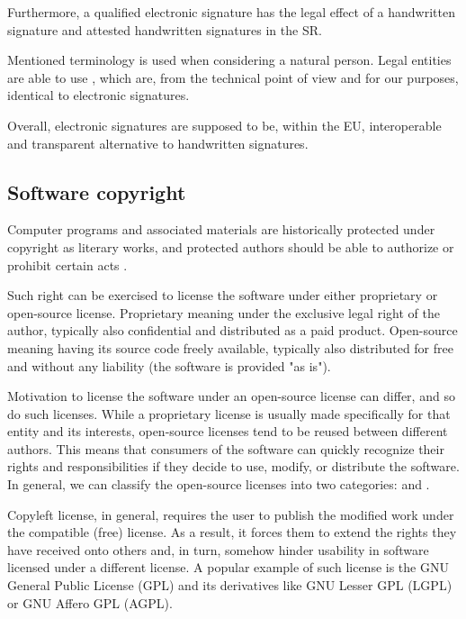 \documentclass[thesismargins, english, thesislinespacing, onelinechapterstyle, upjsfrontpage]{rnthesis}
\begin{document}
Furthermore, a qualified electronic signature has the legal effect of a handwritten signature \cite{eidas} and attested handwritten signatures in the SR.

Mentioned terminology is used when considering a natural person. Legal entities are able to use , which are, from the technical point of view and for our purposes, identical to electronic signatures.

Overall, electronic signatures are supposed to be, within the EU, interoperable and transparent alternative to handwritten signatures.

\subsection{Software copyright} \label{copyright}

Computer programs and associated materials are historically protected under copyright as literary works, and protected authors should be able to authorize or prohibit certain acts \cite{eeccopyright}.

Such right can be exercised to license the software under either proprietary or open-source license.
Proprietary meaning under the exclusive legal right of the author, typically also confidential and distributed as a paid product.
Open-source meaning having its source code freely available, typically also distributed for free and without any liability (the software is provided "as is").

Motivation to license the software under an open-source license can differ, and so do such licenses.
While a proprietary license is usually made specifically for that entity and its interests, open-source licenses tend to be reused between different authors.
This means that consumers of the software can quickly recognize their rights and responsibilities if they decide to use, modify, or distribute the software.
In general, we can classify the open-source licenses into two categories:  and .

Copyleft license, in general, requires the user to publish the modified work under the compatible (free) license.
As a result, it forces them to extend the rights they have received onto others and, in turn, somehow hinder usability in software licensed under a different license.
A popular example of such license is the GNU General Public License (GPL) and its derivatives like GNU Lesser GPL (LGPL) or GNU Affero GPL (AGPL).
\end{document}
